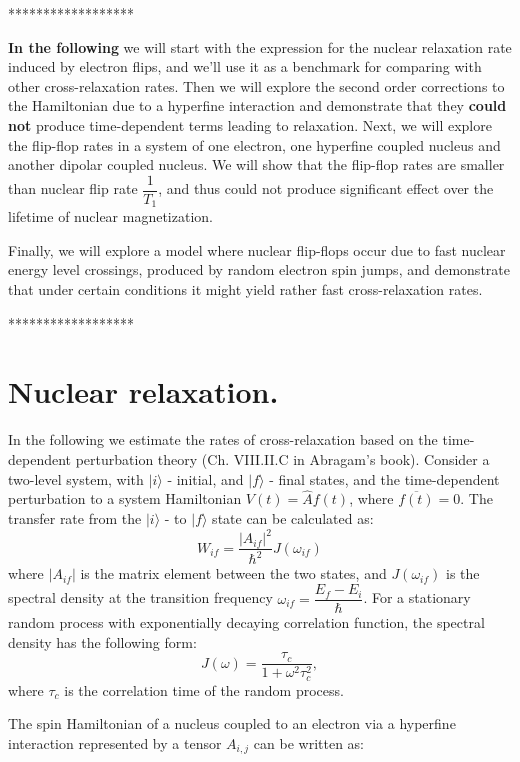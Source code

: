 \documentclass[a4paper, 12pt]{article}
\begin{document}
******************

\textbf{In the following} we will start with the expression for the nuclear relaxation rate induced by electron flips, and we'll use it as a benchmark for comparing with other cross-relaxation rates. Then we will explore the second order corrections to the Hamiltonian due to a hyperfine interaction and demonstrate that they \textbf{could not} produce time-dependent terms leading to relaxation. Next, we will explore the flip-flop rates in a system of one electron, one hyperfine coupled nucleus and another dipolar coupled nucleus. We will show that the flip-flop rates are smaller than nuclear flip rate $\dfrac{1}{T_1}$, and thus could not produce significant effect over the lifetime of nuclear magnetization.

Finally, we will explore a model where nuclear flip-flops occur due to fast nuclear energy level crossings, produced by random electron spin jumps, and demonstrate that under certain conditions it might yield rather fast cross-relaxation rates.

******************

\section{Nuclear relaxation.}
In the following we estimate the rates of cross-relaxation based on the time-dependent perturbation theory (Ch. VIII.II.C in Abragam's book). Consider a two-level system, with $\vert i \rangle$ - initial, and $\vert f \rangle$ - final states, and the time-dependent perturbation to a system Hamiltonian $V(t) = \hat{A} f(t)$, where $\overline{f(t)} = 0$. The transfer rate from the $\vert i \rangle$ - to  $\vert f \rangle$ state can be calculated as:
\begin{equation} \label{eq:rate}
 W_{if} = \dfrac{ \vert A_{if} \vert ^2  }{\hbar^2} J(\omega_{if}) 
\end{equation}
where $\vert A_{if} \vert$ is the matrix element between the two states, and $J({\omega_{if}})$ is the spectral density at the transition frequency $\omega_{if} = \dfrac{E_f - E_i}{\hbar}$. For a stationary random process with exponentially decaying correlation function, the spectral density has the following form:
\begin{equation}
J(\omega) = \dfrac{\tau_c}{1+\omega^2\tau_c^2}, 
\end{equation} 
where $\tau_c$ is the correlation time of the random process.

The spin Hamiltonian of a nucleus coupled to an electron via a hyperfine interaction represented by a tensor $A_{i,j}$ can be written as:
\end{document}
